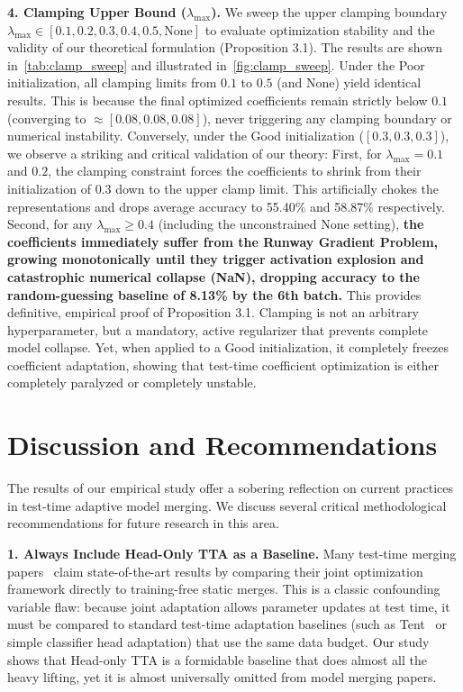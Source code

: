 \documentclass{article}
\theoremstyle{plain}
\theoremstyle{definition}
\theoremstyle{remark}
\begin{document}
\textbf{4. Clamping Upper Bound ($\lambda_{\max}$).} We sweep the upper clamping boundary $\lambda_{\max} \in [0.1, 0.2, 0.3, 0.4, 0.5, \text{None}]$ to evaluate optimization stability and the validity of our theoretical formulation (Proposition 3.1). The results are shown in~\cref{tab:clamp_sweep} and illustrated in~\cref{fig:clamp_sweep}.
Under the Poor initialization, all clamping limits from $0.1$ to $0.5$ (and None) yield identical results. This is because the final optimized coefficients remain strictly below $0.1$ (converging to $\approx [0.08, 0.08, 0.08]$), never triggering any clamping boundary or numerical instability.
Conversely, under the Good initialization ($[0.3, 0.3, 0.3]$), we observe a striking and critical validation of our theory:
First, for $\lambda_{\max} = 0.1$ and $0.2$, the clamping constraint forces the coefficients to shrink from their initialization of $0.3$ down to the upper clamp limit. This artificially chokes the representations and drops average accuracy to 55.40\% and 58.87\% respectively.
Second, for any $\lambda_{\max} \ge 0.4$ (including the unconstrained None setting), \textbf{the coefficients immediately suffer from the Runway Gradient Problem, growing monotonically until they trigger activation explosion and catastrophic numerical collapse (NaN), dropping accuracy to the random-guessing baseline of 8.13\% by the 6th batch.}
This provides definitive, empirical proof of Proposition 3.1. Clamping is not an arbitrary hyperparameter, but a mandatory, active regularizer that prevents complete model collapse. Yet, when applied to a Good initialization, it completely freezes coefficient adaptation, showing that test-time coefficient optimization is either completely paralyzed or completely unstable.


\section{Discussion and Recommendations}
\label{sec:discussion}

The results of our empirical study offer a sobering reflection on current practices in test-time adaptive model merging. We discuss several critical methodological recommendations for future research in this area.

\textbf{1. Always Include Head-Only TTA as a Baseline.}
Many test-time merging papers~\cite{symerge, yang2024adamerging} claim state-of-the-art results by comparing their joint optimization framework directly to training-free static merges. This is a classic confounding variable flaw: because joint adaptation allows parameter updates at test time, it must be compared to standard test-time adaptation baselines (such as Tent~\cite{wang2020tent} or simple classifier head adaptation) that use the same data budget. Our study shows that Head-only TTA is a formidable baseline that does almost all the heavy lifting, yet it is almost universally omitted from model merging papers.
\end{document}
